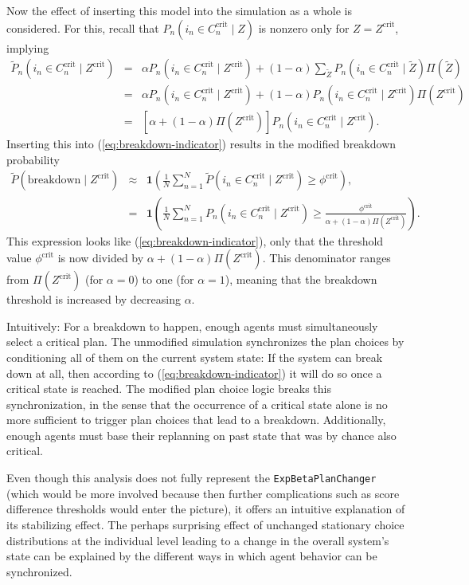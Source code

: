 Now the effect of inserting this model into the simulation as a whole
is considered. For this, recall that $P_{n}(i_{n}\in C_{n}^{\text{crit}}\mid Z)$
is nonzero only for $Z=Z^{\text{crit}}$, implying
\begin{eqnarray}
\tilde{P}_{n}(i_{n}\in C_{n}^{\text{crit}}\mid Z^{\text{crit}}) & = & \alpha P_{n}(i_{n}\in C_{n}^{\text{crit}}\mid Z^{\text{crit}})+(1-\alpha)\sum_{\tilde{Z}}P_{n}(i_{n}\in C_{n}^{\text{crit}}\mid\tilde{Z})\Pi(\tilde{Z})\\
 & = & \alpha P_{n}(i_{n}\in C_{n}^{\text{crit}}\mid Z^{\text{crit}})+(1-\alpha)P_{n}(i_{n}\in C_{n}^{\text{crit}}\mid Z^{\text{crit}})\Pi(Z^{\text{crit}})\\
 & = & [\alpha+(1-\alpha)\Pi(Z^{\text{crit}})]P_{n}(i_{n}\in C_{n}^{\text{crit}}\mid Z^{\text{crit}}).
\end{eqnarray}
Inserting this into (\ref{eq:breakdown-indicator}) results in the
modified breakdown probability
\begin{eqnarray}
\tilde{P}(\text{breakdown}\mid Z^{\text{crit}}) & \approx & \mathbf{1}\left(\frac{1}{N}\sum_{n=1}^{N}\tilde{P}(i_{n}\in C_{n}^{\text{crit}}\mid Z^{\text{crit}})\geq\phi^{\text{crit}}\right),\\
 & = & \mathbf{1}\left(\frac{1}{N}\sum_{n=1}^{N}P_{n}(i_{n}\in C_{n}^{\text{crit}}\mid Z^{\text{crit}})\geq\frac{\phi^{\text{crit}}}{\alpha+(1-\alpha)\Pi(Z^{\text{crit}})}\right).
\end{eqnarray}
This expression looks like (\ref{eq:breakdown-indicator}), only that
the threshold value $\phi^{\text{crit}}$ is now divided by $\alpha+(1-\alpha)\Pi(Z^{\text{crit}})$.
This denominator ranges from $\Pi(Z^{\text{crit}})$ (for $\alpha=0$)
to one (for $\alpha=1$), meaning that the breakdown threshold is
increased by decreasing $\alpha$.

Intuitively: For a breakdown to happen, enough agents must simultaneously
select a critical plan. The unmodified simulation synchronizes the
plan choices by conditioning all of them on the current system state:
If the system can break down at all, then according to (\ref{eq:breakdown-indicator})
it will do so once a critical state is reached. The modified plan
choice logic breaks this synchronization, in the sense that the occurrence
of a critical state alone is no more sufficient to trigger plan choices
that lead to a breakdown. Additionally, enough agents must base their
replanning on past state that was by chance also critical.

Even though this analysis does not fully represent the \texttt{ExpBetaPlanChanger}
(which would be more involved because then further complications such
as score difference thresholds would enter the picture), it offers
an intuitive explanation of its stabilizing effect. The perhaps surprising
effect of unchanged stationary choice distributions at the individual
level leading to a change in the overall system's state can be explained
by the different ways in which agent behavior can be synchronized.





